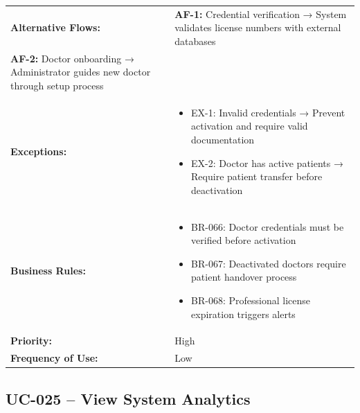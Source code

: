 \documentclass[12pt,a4paper]{article}
\begin{document}
\begin{longtable}{|p{4.5cm}|p{10.5cm}|}
\hline
\textbf{Alternative Flows:} &
\textbf{AF-1:} Credential verification → System validates license numbers with external databases \\
\textbf{AF-2:} Doctor onboarding → Administrator guides new doctor through setup process \\
\hline
\textbf{Exceptions:} &
\begin{itemize}
  \item EX-1: Invalid credentials → Prevent activation and require valid documentation
  \item EX-2: Doctor has active patients → Require patient transfer before deactivation
\end{itemize} \\
\hline
\textbf{Business Rules:} &
\begin{itemize}
  \item BR-066: Doctor credentials must be verified before activation
  \item BR-067: Deactivated doctors require patient handover process
  \item BR-068: Professional license expiration triggers alerts
\end{itemize} \\
\hline
\textbf{Priority:} & High \\
\hline
\textbf{Frequency of Use:} & Low \\
\hline
\end{longtable}

\subsection{UC-025 – View System Analytics}
\end{document}
